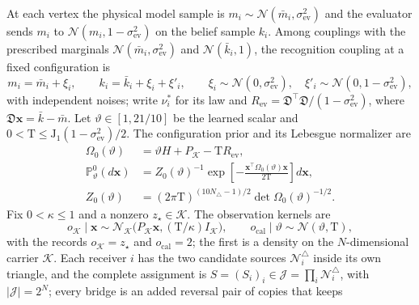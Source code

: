 At each vertex the physical model sample is \(m_i\sim\mathcal N(\bar m_i,
\sigma^2_{\mathrm{ev}})\) and the evaluator sends \(m_i\) to
\(\mathcal N(m_i,1-\sigma^2_{\mathrm{ev}})\) on the belief sample \(k_i\).
Among couplings with the prescribed marginals
\(\mathcal N(\bar m_i,\sigma^2_{\mathrm{ev}})\) and \(\mathcal N(\bar k_i,1)\),
the recognition coupling at a fixed configuration is
\begin{equation}
m_i=\bar m_i+\xi_i,\qquad
k_i=\bar k_i+\xi_i+\xi'_i,\qquad
\xi_i\sim\mathcal N(0,\sigma^2_{\mathrm{ev}}),\quad
\xi'_i\sim\mathcal N(0,1-\sigma^2_{\mathrm{ev}}),
\label{eq:rg-formation-evaluator-lift}
\end{equation}
with independent noises; write \(\nu_i^*\) for its law and
\(R_{\mathrm{ev}}=\mathfrak D^\top\mathfrak D/(1-\sigma^2_{\mathrm{ev}})\),
where \(\mathfrak D\mathbf x=\bar k-\bar m\). Let \(\vartheta\in[1,21/10]\) be
the learned scalar and \(0<\mathrm T\le\mathrm J_1(1-\sigma^2_{\mathrm{ev}})/2\).
The configuration prior and its Lebesgue normalizer are
\begin{equation}
\begin{aligned}
\Omega_0(\vartheta)&=\vartheta H+P_{\mathcal K}-\mathrm TR_{\mathrm{ev}},\\
\mathbb P^0_\vartheta(d\mathbf x)
&=Z_0(\vartheta)^{-1}
  \exp\left[-\frac{\mathbf x^\top\Omega_0(\vartheta)\mathbf x}{2\mathrm T}\right]d\mathbf x,\\
Z_0(\vartheta)&=(2\pi\mathrm T)^{(10N_\triangle-1)/2}\det\Omega_0(\vartheta)^{-1/2}.
\end{aligned}
\label{eq:rg-formation-physical-prior}
\end{equation}
Fix \(0<\kappa\le1\) and a nonzero \(z_\star\in\mathcal K\). The observation
kernels are
\begin{equation}
o_{\mathcal K}\mid\mathbf x\sim
  \mathcal N_{\mathcal K}\bigl(P_{\mathcal K}\mathbf x,(\mathrm T/\kappa)I_{\mathcal K}\bigr),
\qquad
o_{\mathrm{cal}}\mid\vartheta\sim\mathcal N(\vartheta,\mathrm T),
\label{eq:rg-formation-observation-kernels}
\end{equation}
with the records \(o_{\mathcal K}=z_\star\) and \(o_{\mathrm{cal}}=2\); the
first is a density on the \(N\)-dimensional carrier \(\mathcal K\). Each
receiver \(i\) has the two candidate sources \(\mathcal N_i^\triangle\) inside
its own triangle, and the complete assignment is
\(S=(S_i)_i\in\mathcal J=\prod_i\mathcal N_i^\triangle\), with
\(|\mathcal J|=2^N\); every bridge is an added reversal pair of copies that keeps
